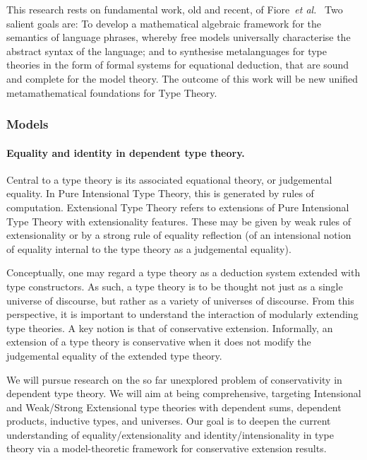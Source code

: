 \documentclass[11pt,twocolumn]{article}
\newcommand{\hl}[1]{#1}%
\newcommand{\etal}{\emph{et al.}}
\begin{document}
This research rests on fundamental work, old and recent, of
Fiore~\etal\
Two salient \hl{goals} are: To develop a mathematical algebraic framework
for the semantics of language phrases, whereby free models universally
characterise the abstract syntax of the language; and to synthesise
metalanguages for type theories in the form of formal systems for equational
deduction, that are sound and complete for the model theory.  The outcome of
this work will be new unified metamathematical foundations for Type Theory.

\subsubsection{Models}
\label{Models}

\paragraph{Equality and identity in dependent type theory.}
\label{IntensionalTypeTheoryParagraph}

Central to a type theory is its associated equational theory, or judgemental
equality.  In Pure Intensional Type Theory, this is generated by rules of
computation.  Extensional Type Theory refers to extensions of Pure Intensional
Type Theory with extensionality features.  These may be given by weak rules of
extensionality or by a strong rule of equality reflection (of an intensional
notion of equality internal to the type theory as a judgemental equality).  

Conceptually, one may regard a type theory as a deduction system extended with
type constructors.  As such, a type theory is to be thought not just as a
single universe of discourse, but rather as a variety of universes of
discourse.  From this perspective, it is important to understand the
interaction of modularly extending type theories.  A key notion is that of
conservative extension.  
Informally, an extension of a type theory is
conservative when it does not modify the judgemental equality of the extended
type theory.

We will pursue \hl{research} on the so far unexplored problem of
conservativity in dependent type theory.  We will \hl{aim} at being
comprehensive, targeting Intensional and Weak/Strong Extensional type theories
with dependent sums, dependent products, inductive types, and universes.  Our
\hl{goal} is to deepen the current understanding of equality/extensionality
and identity/intensionality in type theory via a model-theoretic framework for
conservative extension results.  
\end{document}
